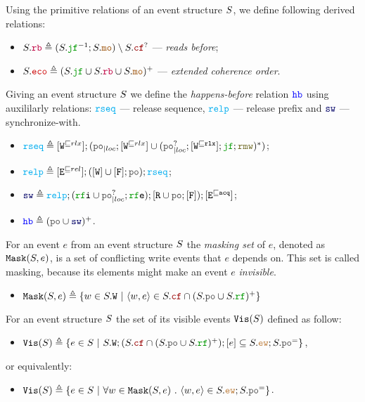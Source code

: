 \documentclass[12pt]{article}
\begin{document}
\begin{definition}
  Using the primitive relations of an event structure $S$,
  we define following derived relations:
  \begin{itemize}
    \item $\lES.\lRB \defeq (\lES.\lJF^{-1};\lES.\lMO) \setminus \lES.\lCF^?$ --- 
      \emph{reads before};
    \item $\lES.\lECO \defeq (\lES.\lJF \cup \lES.\lRB \cup \lES.\lMO)^+$ --- 
      \emph{extended coherence order}.
  \end{itemize}
\end{definition}

\begin{definition}
  Giving an event structure $S$ we define the \emph{happens-before} relation $\lHB$
  using auxililarly relations: 
  $\lRSEQ$ --- release sequence,
  $\lRELP$ --- release prefix and
  $\lSW$ --- synchronize-with.
  \begin{itemize}
  \item $\lRSEQ \defeq [\lWsqeq{rlx}];(\lmakeLoc{\lPO};[\lWsqeq{rlx}] \cup 
    (\lmakeLoc{\lPO^?};[\lWsqeq{\rlx}];\lJF;\lRMW)^*)$;
  \item $\lRELP \defeq [\lEsqeq{rel}];([\lW] \cup [\lF];\lPO);\lRSEQ$;
  \item $\lSW \defeq \lRELP; (\lRFI \cup \lmakeLoc{\lPO^?};\lRFE); [\lR \cup \lPO;[\lF]);[\lEsqeq{\acq}]$;
  \item $\lHB \defeq (\lPO \cup \lSW)^+$.
  \end{itemize}
\end{definition}

\begin{definition}
  For an event $e$ from an event structure $S$
  the \emph{masking set} of $e$, denoted as ${\mathtt{Mask}}(S, e)$,
  is a set of conflicting write events that $e$ depends on.
  This set is called masking, because its elements might make an event $e$ \emph{invisible}.
  \begin{itemize}
  \item $\lMASK(\lES, e) \defeq
    \{w \in \lES.\lW ~|~ \tup{w, e} \in \lES.\lCF \cap (\lES.\lPO \cup \lES.\lRF)^+ \}$
  \end{itemize}
\end{definition}

\begin{definition}
  For an event structure $S$ the set of its visible events ${\mathtt{Vis}}(S)$ defined as follow:
  \begin{itemize}
    \item $\lVIS(\lES) \defeq 
      \{ e \in \lES ~|~ \lES.\lW;(\lES.\lCF \cap (\lES.\lPO \cup \lES.\lRF)^+);[e] \subseteq 
         \lES.\lEW;\lES.\lPO^=
      \}$,
  \end{itemize}
  or equivalently:
  \begin{itemize}
    \item $\lVIS(\lES) \defeq 
      \{ e \in \lES ~|~ \forall{w \in \lMASK(\lES, e)} ~.~ \tup{w, e} \in \lES.\lEW;\lES.\lPO^=\}$.
  \end{itemize}
\end{definition}
\end{document}
